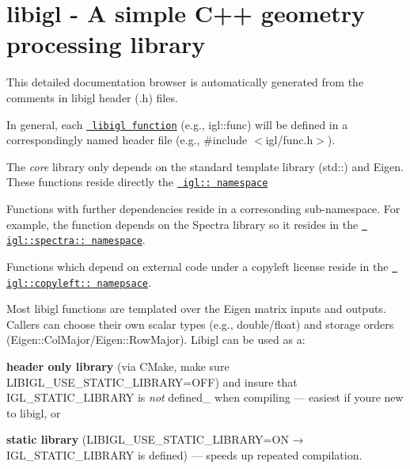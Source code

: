 \chapter{libigl -\/ A simple C++ geometry processing library}
\hypertarget{index}{}\label{index}
\label{index_md_docs_2index}%
%
 This detailed documentation browser is automatically generated from the comments in libigl header (.h) files.

In general, each \href{./namespaceigl.html\#func-members}{\texttt{ libigl function}} (e.\+g., {\ttfamily igl\+::func}) will be defined in a correspondingly named header file (e.\+g., {\ttfamily \#include \texorpdfstring{$<$}{<}igl/func.\+h\texorpdfstring{$>$}{>}}).

The {\itshape core} library only depends on the standard template library ({\ttfamily std\+:\+:}) and Eigen. These functions reside directly the \href{./namespaceigl.html}{\texttt{ {\ttfamily igl\+:\+:} namespace}}

Functions with further dependencies reside in a corresonding sub-\/namespace. For example, the function {\ttfamily {}} depends on the Spectra library so it resides in the \href{./namespaceigl_1_1spectra.html}{\texttt{ {\ttfamily igl\+::spectra\+:\+:} namespace}}.

Functions which depend on external code under a copyleft license reside in the \href{file:///Users/alecjacobson/Repos/libigl/dox/namespaceigl_1_1copyleft.html}{\texttt{ {\ttfamily igl\+::copyleft\+:\+:} namepsace}}.

Most libigl functions are templated over the Eigen matrix inputs and outputs. Callers can choose their own scalar types (e.\+g., {\ttfamily double}/{\ttfamily float}) and storage orders ({\ttfamily Eigen\+::\+Col\+Major}/{\ttfamily Eigen\+::\+Row\+Major}). Libigl can be used as a\+:


\begin{DoxyItemize}
\item {\bfseries{header only library}} (via CMake, make sure {\ttfamily LIBIGL\+\_\+\+USE\+\_\+\+STATIC\+\_\+\+LIBRARY=OFF}) and insure that {\ttfamily IGL\+\_\+\+STATIC\+\_\+\+LIBRARY} is {\itshape not} defined\+\_\+ when compiling --- easiest if you\textquotesingle{}re new to libigl, or
\item {\bfseries{static library}} ({\ttfamily LIBIGL\+\_\+\+USE\+\_\+\+STATIC\+\_\+\+LIBRARY=ON} → {\ttfamily IGL\+\_\+\+STATIC\+\_\+\+LIBRARY} is defined) --- speeds up repeated compilation.
\end{DoxyItemize}


